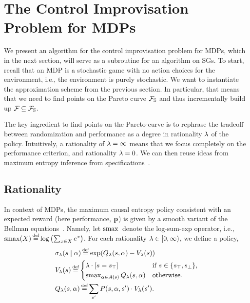 \section{The Control Improvisation Problem for MDPs}
\label{sec:mdps}

We present an algorithm for the control improvisation problem for
MDPs, which in the next section, will serve as a subroutine for an algorithm
on SGs. To start, recall that an MDP is a stochastic game with no action choices for the environment, i.e., the environment is purely stochastic. 
We want to instantiate the approximation scheme from the previous section. In particular, that means that we need to find points on the Pareto curve $\mathcal{F}_{\mathbb{S}}$ and thus incrementally build up $\mathcal{F}_{} \subseteq \mathcal{F}_{\mathbb{S}}$. 

The
key ingredient to find points on the Pareto-curve is to rephrase the tradeoff between randomization and
performance as a degree in rationality $\lambda$ of the
policy. Intuitively, a rationality of $\lambda = \infty$ means that we
focus completely on the performance criterion, and rationality $\lambda =
0$. We can then reuse ideas from maximum entropy inference from
specifications~\cite{DBLP:conf/cav/Vazquez-Chanlatte20}.

\subsection{Rationality}

\noindent
In context of MDPs, the maximum causal entropy policy consistent with
an expected reward (here performance, $\mathbf{p}$) is given by a
smooth variant of the Bellman equations~\cite{mceThesis}. Namely, let
$\operatorname*{\mathrm{smax}}{}$ denote the log-sum-exp operator, i.e., $\smoothmax(X)
\eqdef \log \left( \sum_{x\in X} e^x \right)$. For each rationality
$\lambda \in [0, \infty)$, we define a policy,
 \begin{align}
   &\sched_\rat(s\mid \act) \eqdef \exp( Q_\rat(s,\act) - V_\rat(s))  \\
   & V_\rat(s) \eqdef  \begin{cases}
     \lambda  \cdot \indicator{s = \target} & \text{if }s \in \{ \target, \sink \},\\
     \smoothmax_{\act \in \EnAct(s)}{  Q_\rat(s,\act) } & \text{otherwise.}
   \end{cases}\\ 
	& Q_\rat(s, \act) \eqdef \sum_{s'} P(s,\act,s') \cdot V_\rat(s').
 \end{align}

